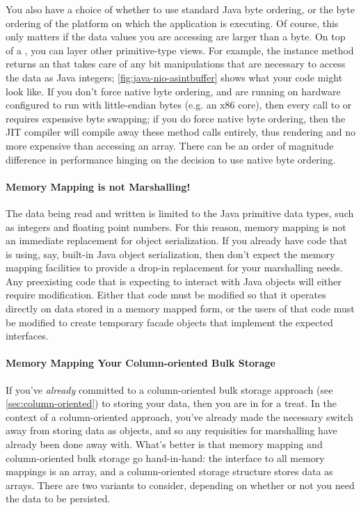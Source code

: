 You also have a choice of whether to use standard Java byte ordering, or the
byte ordering of the platform on which the application is executing. Of course,
this only matters if the data values you are accessing are larger than a byte.
On top of a , you can layer other primitive-type views. For
example, the instance method  returns an
 that takes care of any bit manipulations that are necessary to
access the data as Java integers; \autoref{fig:java-nio-asintbuffer} shows what
your code might look like. If you don't force native byte ordering, and are
running on hardware configured to run with little-endian bytes (e.g. an x86
core), then every call to  or  requires expensive byte
swapping; if you do force native byte ordering, then the JIT compiler will
compile away these method calls entirely, thus rendering  and
 no more expensive than accessing an array. There can be an order
of magnitude difference in performance hinging on the decision to use native
byte ordering.


\paragraph{Memory Mapping is not Marshalling!}
The data being read and written is limited to the Java primitive data types,
such as integers and floating point numbers. For this reason, memory mapping is
not an immediate replacement for object serialization. If you already have code
that is using, say, built-in Java object serialization, then don't expect the
 memory mapping facilities to provide a drop-in replacement for
your marshalling needs. Any preexisting code that is expecting to interact with
Java objects will either require modification. Either that code must be modified
so that it operates directly on data stored in a memory mapped form, or the
users of that code must be modified to create temporary facade objects that
implement the expected interfaces.

\paragraph{Memory Mapping Your Column-oriented Bulk Storage}
If you've \emph{already} committed to a column-oriented bulk storage approach
(see \autoref{sec:column-oriented}) to storing your data, then you are in for a
treat. In the context of a column-oriented approach, you've already made the
necessary switch away from storing data as objects, and so any requisities for
marshalling have already been done away with. What's better is that memory
mapping and column-oriented bulk storage go hand-in-hand: the interface to all
memory mappings is an array, and a column-oriented storage structure stores data
as arrays. There are two variants to consider, depending on whether or not you
need the data to be persisted. 

